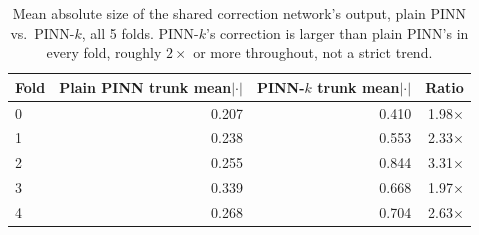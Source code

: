 \documentclass[logo,msc,ai]{infthesis}           %
\begin{document}
\begin{table}[H]
\centering
\scriptsize
\begin{tabular}{lrrr}
\toprule
Fold & Plain PINN trunk mean$|\cdot|$ & PINN-$k$ trunk mean$|\cdot|$ & Ratio \\
\midrule
0 & 0.207 & 0.410 & 1.98$\times$ \\
1 & 0.238 & 0.553 & 2.33$\times$ \\
2 & 0.255 & 0.844 & 3.31$\times$ \\
3 & 0.339 & 0.668 & 1.97$\times$ \\
4 & 0.268 & 0.704 & 2.63$\times$ \\
\bottomrule
\end{tabular}
\caption{\small{Mean absolute size of the shared correction network's output, plain PINN vs.\
PINN-$k$, all 5 folds. PINN-$k$'s correction is larger than plain PINN's in every fold,
roughly $2\times$ or more throughout, not a strict trend.}}
\label{tab:trunk-residual}
\end{table}
\end{document}

